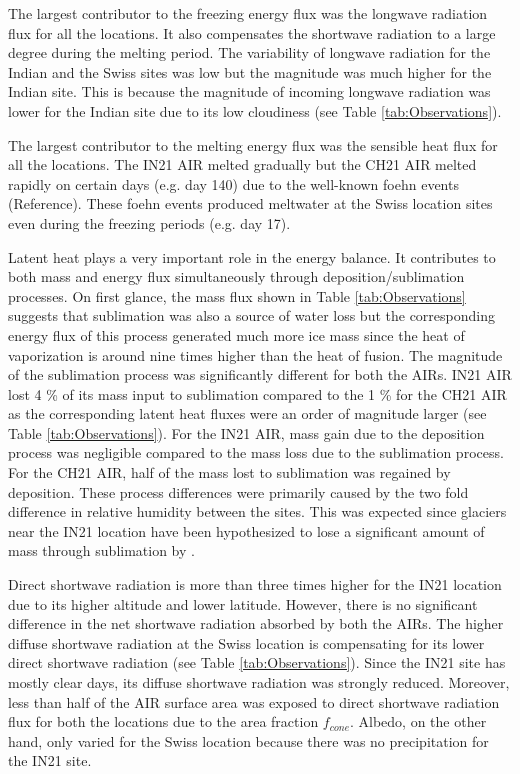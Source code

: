 \documentclass[utf8]{frontiersSCNS} %
\begin{document}
The largest contributor to the freezing energy flux was the longwave radiation flux for all the locations.
It also compensates the shortwave radiation to a large degree during the melting period. The variability of
longwave radiation for the Indian and the Swiss sites was low but the magnitude was much higher for the Indian
site. This is because the  magnitude of incoming longwave radiation was lower for the Indian site due to its low
cloudiness (see Table \ref{tab:Observations}).

The largest contributor to the melting energy flux was the sensible heat flux for all the locations. The IN21 AIR
melted gradually but the CH21 AIR melted rapidly on certain days (e.g.  day 140) due to the well-known foehn events
(Reference). These foehn events produced meltwater at the Swiss location sites even during the freezing periods
(e.g.  day 17).

Latent heat plays a very important role in the energy balance. It contributes to both mass and energy flux
simultaneously through deposition/sublimation processes. On first glance, the mass flux shown in Table
\ref{tab:Observations} suggests that sublimation was also a source of water loss but the corresponding energy flux
of this process generated much more ice mass since the heat of vaporization is around nine times higher than the
heat of fusion. The magnitude of the sublimation process was significantly different for both the AIRs. IN21 AIR
lost 4 \% of its mass input to sublimation compared to the 1 \% for the CH21 AIR as the corresponding latent heat
fluxes were an order of magnitude larger (see Table \ref{tab:Observations}). For the IN21 AIR, mass gain due to the
deposition process was negligible compared to the mass loss due to the sublimation process. For the CH21 AIR, half
of the mass lost to sublimation was regained by deposition.  These process differences were primarily caused by the
two fold difference in relative humidity between the sites. This was expected since glaciers near the IN21 location
have been hypothesized to lose a significant amount of mass through sublimation by \cite{azam_2018}.

Direct shortwave radiation is more than three times higher for the IN21 location due to its higher altitude and
lower latitude. However, there is no significant difference in the net shortwave radiation absorbed by both the
AIRs. The higher diffuse shortwave radiation at the Swiss location is compensating for its lower direct
shortwave radiation (see Table \ref{tab:Observations}). Since the IN21 site has mostly clear days, its diffuse
shortwave radiation was strongly reduced. Moreover, less than half of the AIR surface area was exposed to direct
shortwave radiation flux for both the locations due to the area fraction $f_{cone}$.   Albedo, on the other
hand, only varied for the Swiss location because there was no precipitation for the IN21 site.
\end{document}
